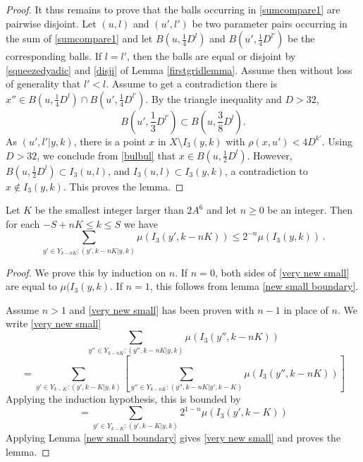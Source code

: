 \begin{proof}
It thus remains to prove that the balls
occurring in
\eqref{sumcompare1} are pairwise disjoint.
Let $(u,l)$ and $(u',l')$ be two parameter pairs occurring
in the sum of \eqref{sumcompare1} and let
$ B(u, \frac 14 D^l)$ and $B({u'}, \frac 14 D^{l'})$
be the corresponding balls. If
$l=l'$, then the balls are equal or disjoint by
\eqref{squeezedyadic} and \eqref{disji} of Lemma \ref{firstgridlemma}. Assume then without loss of generality that $l'<l$. Assume to get a contradiction there is $x''\in  B(u, \frac 14 D^l)\cap B({u'}, \frac 14 D^{l'})$.
By the triangle inequality and $D>32$,
\begin{equation}\label{bulbul}
    B(u', \frac 13 D^{l'})\subset B(u, \frac 38 D^l).
\end{equation}
As $(u',l'|y,k)$, there is a point  $x$ in
$X\setminus I_3(y,k)$ with $\rho(x,u')<4D^{k'}$.
Using $D>32$, we conclude from \eqref{bulbul} that
$x\in B(u,\frac 12D^l)$. However, $B(u,\frac 12 D^l)\subset I_3(u,l)$,
and $I_3(u,l)\subset I_3(y,k)$, a contradiction to
$x\not\in I_3(y,k)$.
This proves the lemma.
\end{proof}


\begin{lemma}
Let $K$ be the smallest integer larger than $2A^6$
and let $n\ge 0$ be an integer. Then
for each $-S+nK\le k\le S$ we have
   \begin{equation}
        \label{very new small}
        \sum_{y'\in Y_{k-nK}: (y',k-nK|y,k)}\mu(I_3(y',k-nK)) \le 2^{-n} \mu(I_3(y,k))\,.
    \end{equation}
\end{lemma}
\begin{proof}
    We prove this by induction on $n$. If $n=0$,
    both sides of \eqref{very new small} are equal to
    $\mu(I_3(y,k)$. If $n=1$, this follows from lemma \ref{new small boundary}.

    Assume $n>1$ and \eqref{very new small} has been proven with  $n-1$ in place of $n$.
We write  \eqref{very new small}
     \begin{equation}
             \sum_{y''\in Y_{k-nK}: (y'',k-nK|y,k)}\mu(I_3(y'',k-nK))
    \end{equation}
     \begin{equation}
=  \sum_{y'\in Y_{k-K}:(y',k-K|y,k)}   \left[   \sum_{y''\in Y_{k-nK}: (y'',k-nK|y',k-K)}\mu(I_3(y'',k-nK)) \right]
    \end{equation}
Applying the induction hypothesis, this is bounded by
         \begin{equation}
=  \sum_{y'\in Y_{k-K}:(y',k-K|y,k)}   2^{1-n}\mu(I_3(y',k-K))
    \end{equation}
Applying Lemma \ref{new small boundary} gives
\eqref{very new small} and proves the lemma.
\end{proof}

